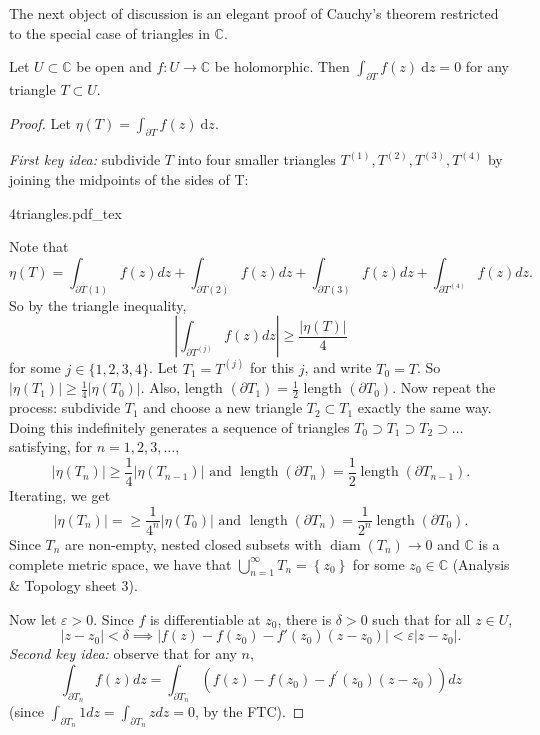 \documentclass[a4paper]{scrartcl}
\newcommand{\incfig}[2]{%
    \def\svgwidth{#1mm}
    {#2.pdf_tex}
}
\begin{document}
The next object of discussion is an elegant proof of Cauchy's theorem restricted to the special case of triangles in $\mathbb{C}$.
\begin{theorem}\label{cauchytriangle}
      Let $U \subset \mathbb{C}$ be open and $f: U \rightarrow \mathbb{C}$ be holomorphic. Then $\int_{\partial T}^{}f (z) \ \mathrm{d}z=0 $ for any triangle $T \subset U$.
\end{theorem}
\begin{proof}
      Let $\eta (T)=\int_{\partial T}^{}f (z) \ \mathrm{d}z$.
      
      \emph{First key idea:} subdivide $T$ into four smaller triangles $T^{(1)},T^{(2)},T^{(3)},T^{(4)}$ by joining the midpoints of the sides of T:
      
      \incfig{40}{4triangles}
      
      Note that \[
          \eta(T)=\int_{\partial T(1)} f(z) d z+\int_{\partial T(2)} f(z) d z+\int_{\partial T(3)} f(z) d z+\int_{\partial T^{(4)}} f(z) d z
      .\] 
     So by the triangle inequality,
     $$
     \left|\int_{\partial T^{(j)}} f(z) d z\right| \geq \frac{|\eta(T)|}{4}
     $$
     for some $j \in\{1,2,3,4\}$. Let $T_{1}=T^{(j)}$ for this $j$, and write $T_{0}=T$. So $\left|\eta\left(T_{1}\right)\right| \geq \frac{1}{4}\left|\eta\left(T_{0}\right)\right|$. Also, length $\left(\partial T_{1}\right)=\frac{1}{2}$ length $\left(\partial T_{0}\right)$.
     Now repeat the process: subdivide $T_{1}$ and choose a new triangle $T_{2} \subset T_{1}$ exactly the same way. Doing this indefinitely generates a sequence of triangles $T_{0} \supset T_{1} \supset T_{2} \supset \ldots$ satisfying, for $n=1,2,3, \ldots$, \[
     |\eta (T_{n})| \geq \frac{1}{4}|\eta (T_{n-1})| \text{ and } \operatorname{length}(\partial T_{n})=\frac{1}{2}\operatorname{length}(\partial T_{n-1})
     .\] Iterating, we get \[
          |\eta (T_{n})|=\geq \frac{1}{4^{n}}|\eta (T_{0})| \text{ and } \operatorname{length}(\partial T_{n})=\frac{1}{2^{n}}\operatorname{length}(\partial T_{0})
     .\] Since $T_{n}$ are non-empty, nested closed subsets with $\operatorname{diam}(T_{n})\rightarrow 0$ and $\mathbb{C}$ is a complete metric space, we have that $\bigcup_{n=1}^{ \infty}T_{n}=\left\{z_0 \right\}$ for some $z_0 \in \mathbb{C}$ (Analysis \& Topology sheet 3).

     Now let $\varepsilon >0$. Since $f$ is differentiable at $z_0 $, there is $\delta >0$ such that for all $z \in U$, \[
     |z-z_0 |<\delta \implies |f (z)-f (z_0 )-f' (z_0 )(z-z_0 )| < \varepsilon |z-z_0 |
     .\] \emph{Second key idea:} observe that for any $n$, \[
          \int_{\partial T_{n}} f(z) d z=\int_{\partial T_{n}}\left(f(z)-f\left(z_{0}\right)-f^{\prime}\left(z_{0}\right)\left(z-z_{0}\right)\right) d z
     \] (since $\int_{\partial T_{n}} 1 d z=\int_{\partial T_{n}} z d z=0$, by the FTC). 
     

\end{proof}
\end{document}
